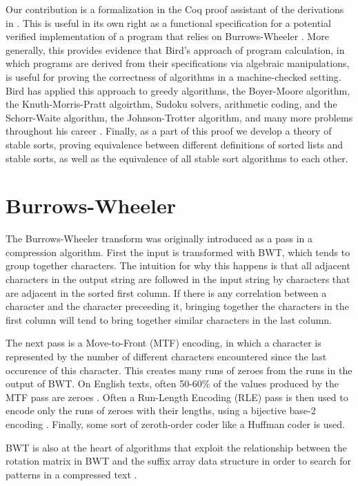 \documentclass[11pt]{article}
\begin{document}
Our contribution is a formalization in the Coq proof assistant of the
derivations in \cite{birdmu,pearls}. This is useful in its own right
as a functional specification for a potential verified implementation
of a program that relies on Burrows-Wheeler \cite{appel-func-spec}.
More generally, this provides evidence that Bird's approach of
program calculation, in which programs are derived from their
specifications via algebraic manipulations, is useful for proving the
correctness of algorithms in a machine-checked setting. Bird has
applied this approach to greedy algorithms, the Boyer-Moore algorithm,
the Knuth-Morris-Pratt algoirthm, Sudoku solvers, arithmetic coding,
and the Schorr-Waite algorithm, the Johnson-Trotter algorithm, and
many more problems throughout his career \cite{pearls}. Finally, as a
part of this proof we develop a theory of stable sorts, proving
equivalence between different definitions of sorted lists and stable
sorts, as well as the equivalence of all stable sort algorithms to
each other.

\section{Burrows-Wheeler}
\label{sec:bw}

The Burrows-Wheeler transform was originally introduced as a pass in a
compression algorithm. First the input is transformed with BWT, which
tends to group together characters. The intuition for why this happens
is that all adjacent characters in the output string are followed in
the input string by characters that are adjacent in the sorted first
column. If there is any correlation between a character and the
character preceeding it, bringing together the characters in the first
column will tend to bring together similar characters in the last
column.

The next pass is a Move-to-Front (MTF) encoding, in which a character
is represented by the number of different characters encountered since
the last occurence of this character. This creates many runs of zeroes
from the runs in the output of BWT. On English texts, often 50-60\% of
the values produced by the MTF pass are zeroes
\cite{fenwick2007,bw-analysis}. Often a Run-Length Encoding (RLE) pass
is then used to encode only the runs of zeroes with their lengths,
using a bijective base-2 encoding \cite{bw-analysis, tsai_2016}.
Finally, some sort of zeroth-order coder like a Huffman coder is used.

BWT is also at the heart of algorithms that exploit the relationship
between the rotation matrix in BWT and the suffix array data structure
in order to search for patterns in a compressed text
\cite{ferragina_index}.
\end{document}
